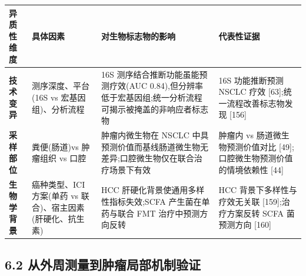 \documentclass[11pt]{article}
\newcounter{none}
\begin{document}
{\def\LTcaptype{none} %
\begin{longtable}[]{@{}
  >{\raggedright\arraybackslash}p{}
  >{\raggedright\arraybackslash}p{}
  >{\raggedright\arraybackslash}p{}
  >{\raggedright\arraybackslash}p{}@{}}
\toprule\noalign{}
\begin{minipage}[b]{\linewidth}\raggedright
异质性维度
\end{minipage} & \begin{minipage}[b]{\linewidth}\raggedright
具体因素
\end{minipage} & \begin{minipage}[b]{\linewidth}\raggedright
对生物标志物的影响
\end{minipage} & \begin{minipage}[b]{\linewidth}\raggedright
代表性证据
\end{minipage} \\
\midrule\noalign{}
\endhead
\bottomrule\noalign{}
\endlastfoot
\textbf{技术变异} & 测序深度、平台(16S vs 宏基因组)、分析流程 & 16S 测序结合推断功能虽能预测疗效(AUC 0.84),但分辨率低于宏基因组;统一分析流程可揭示被掩盖的非响应者标志物 & 16S 功能推断预测 NSCLC 疗效 {[}63{]};统一流程改善标志物发现 {[}156{]} \\
\textbf{采样部位} & 粪便(肠道)vs 肿瘤组织 vs 口腔 & 肿瘤内微生物在 NSCLC 中具预测价值而基线肠道微生物无差异;口腔微生物仅在联合治疗场景下有效 & 肿瘤内 vs 肠道微生物预测价值对比 {[}49{]};口腔微生物预测价值的情境依赖性 {[}44{]} \\
\textbf{生物学背景} & 癌种类型、ICI 方案(单药 vs 联合)、宿主因素(肝硬化、抗生素) & HCC 肝硬化背景使通用多样性指标失效;SCFA 产生菌在单药与联合 FMT 治疗中预测方向反转 & HCC 背景下多样性与疗效无关联 {[}159{]};治疗方案反转 SCFA 菌预测方向 {[}160{]} \\
\end{longtable}
}

\subsection{6.2 从外周测量到肿瘤局部机制验证}\label{ux4eceux5916ux5468ux6d4bux91cfux5230ux80bfux7624ux5c40ux90e8ux673aux5236ux9a8cux8bc1}
\end{document}
